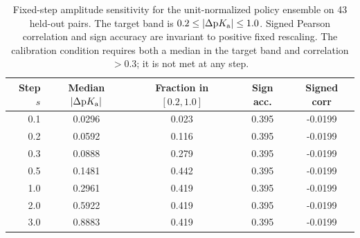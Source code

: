 \begin{table}[h]
\centering
\caption{Fixed-step amplitude sensitivity for the unit-normalized policy ensemble on 43 held-out pairs. The target band is $0.2\leq|\Delta\mathrm{p}K_{\mathrm a}|\leq1.0$. Signed Pearson correlation and sign accuracy are invariant to positive fixed rescaling. The calibration condition requires both a median in the target band and correlation $>0.3$; it is not met at any step.}
\label{tab:step_sensitivity}
\small
\begin{tabular}{rcccc}
\toprule
Step $s$ & Median $|\Delta\mathrm{p}K_{\mathrm a}|$ & Fraction in $[0.2,1.0]$ & Sign acc. & Signed corr \\
\midrule
0.1 & 0.0296 & 0.023 & 0.395 & -0.0199 \\
0.2 & 0.0592 & 0.116 & 0.395 & -0.0199 \\
0.3 & 0.0888 & 0.279 & 0.395 & -0.0199 \\
0.5 & 0.1481 & 0.442 & 0.395 & -0.0199 \\
1.0 & 0.2961 & 0.419 & 0.395 & -0.0199 \\
2.0 & 0.5922 & 0.419 & 0.395 & -0.0199 \\
3.0 & 0.8883 & 0.419 & 0.395 & -0.0199 \\
\bottomrule
\end{tabular}
\end{table}
